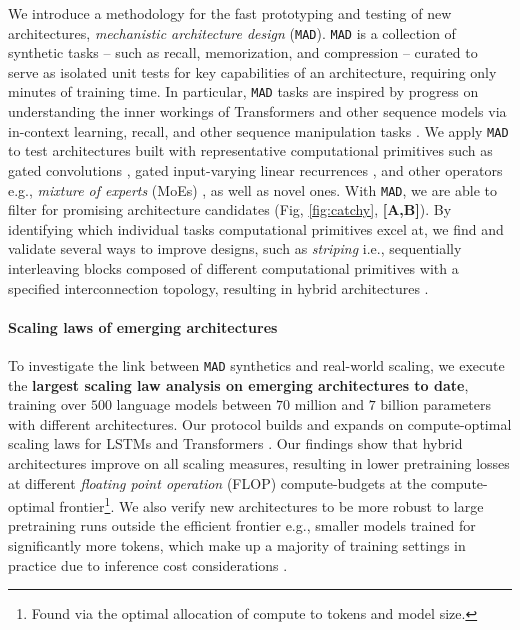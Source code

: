 We introduce a methodology for the fast prototyping and testing of new architectures, \textit{mechanistic architecture design} ({\tt MAD}). {\tt MAD} is a collection of synthetic tasks -- such as recall, memorization, and compression -- curated to serve as isolated unit tests for key capabilities of an architecture, requiring only minutes of training time. In particular, {\tt MAD} tasks are inspired by progress on understanding the inner workings of Transformers and other sequence models via in-context learning, recall, and other sequence manipulation tasks \cite{olsson2022context,fu2022hungry,bhattamishra2023understanding,arora2023zoology,akyurek2024context}. We apply {\tt MAD} to test architectures built with representative computational primitives such as gated convolutions \cite{poli2023hyena}, gated input-varying linear recurrences \cite{gu2023mamba,yang2023gated}, and other operators e.g., \textit{mixture of experts} (MoEs) \cite{shazeer2017outrageously}, as well as novel ones. With {\tt MAD}, we are able to filter for promising architecture candidates (Fig, \ref{fig:catchy}, \textbf{[A,B]}). By identifying which individual tasks computational primitives excel at, we find and validate several ways to improve designs, such as \textit{striping} i.e., sequentially interleaving blocks composed of different computational primitives with a specified interconnection topology, resulting in hybrid architectures \cite{ma2022mega, fu2022hungry,fathi2023block}.

\paragraph{Scaling laws of emerging architectures}

To investigate the link between {\tt MAD} synthetics and real-world scaling, we execute the \textbf{largest scaling law analysis on emerging architectures to date}, training over $500$ language models between $70$ million and $7$ billion parameters with different architectures. Our protocol builds and expands on compute-optimal scaling laws for LSTMs and Transformers \cite{kaplan2020scaling,stanic2023languini,hoffmann2022training}. Our findings show that hybrid architectures improve on all scaling measures, resulting in lower pretraining losses at different \textit{floating point operation} (FLOP) compute-budgets at the compute-optimal frontier\footnote{Found via the optimal allocation of compute to tokens and model size.}. We also verify new architectures to be more robust to large pretraining runs outside the efficient frontier e.g., smaller models trained for significantly more tokens, which make up a majority of training settings in practice due to inference cost considerations \cite{sardana2023beyond}. 

